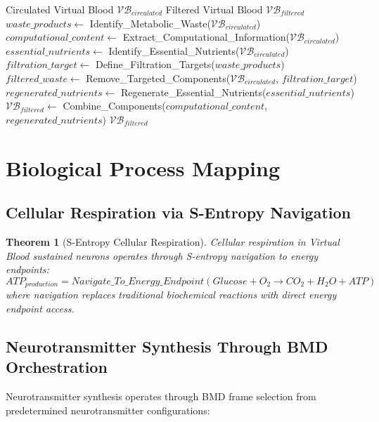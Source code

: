 \documentclass[12pt,a4paper]{article}
\newtheorem{theorem}{Theorem}
\begin{document}
\begin{algorithm}
\caption{S-Entropy Virtual Blood Filtration}
\begin{algorithmic}[1]
\REQUIRE Circulated Virtual Blood $\mathcal{VB}_{circulated}$
\ENSURE Filtered Virtual Blood $\mathcal{VB}_{filtered}$
\STATE $waste\_products \leftarrow$ Identify\_Metabolic\_Waste($\mathcal{VB}_{circulated}$)
\STATE $computational\_content \leftarrow$ Extract\_Computational\_Information($\mathcal{VB}_{circulated}$)
\STATE $essential\_nutrients \leftarrow$ Identify\_Essential\_Nutrients($\mathcal{VB}_{circulated}$)
\STATE $filtration\_target \leftarrow$ Define\_Filtration\_Targets($waste\_products$)
\STATE $filtered\_waste \leftarrow$ Remove\_Targeted\_Components($\mathcal{VB}_{circulated}$, $filtration\_target$)
\STATE $regenerated\_nutrients \leftarrow$ Regenerate\_Essential\_Nutrients($essential\_nutrients$)
\STATE $\mathcal{VB}_{filtered} \leftarrow$ Combine\_Components($computational\_content$, $regenerated\_nutrients$)
\RETURN $\mathcal{VB}_{filtered}$
\end{algorithmic}
\end{algorithm}

\section{Biological Process Mapping}

\subsection{Cellular Respiration via S-Entropy Navigation}

\begin{theorem}[S-Entropy Cellular Respiration]
Cellular respiration in Virtual Blood sustained neurons operates through S-entropy navigation to energy endpoints:
\begin{equation}
ATP_{production} = Navigate\_To\_Energy\_Endpoint(Glucose + O_2 \rightarrow CO_2 + H_2O + ATP)
\end{equation}
where navigation replaces traditional biochemical reactions with direct energy endpoint access.
\end{theorem}

\subsection{Neurotransmitter Synthesis Through BMD Orchestration}

Neurotransmitter synthesis operates through BMD frame selection from predetermined neurotransmitter configurations:
\end{document}

